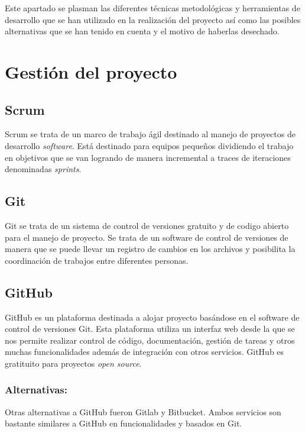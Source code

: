 
Este apartado se plasman las diferentes técnicas metodológicas y herramientas de desarrollo que se han utilizado en la realización del proyecto así como las posibles alternativas que se han tenido en cuenta y el motivo de haberlas desechado.

\section{Gestión del proyecto}\label{GesProyecto}
\subsection{Scrum}\label{Scrum}
Scrum se trata de un marco de trabajo ágil destinado al manejo de proyectos de desarrollo \emph{software}. Está destinado para equipos pequeños dividiendo el trabajo en objetivos que se van logrando de manera incremental a traces de iteraciones denominadas \emph{sprints}. \cite{wiki:scrm}

\subsection{Git}\label{Git}
Git se trata de un sistema de control de versiones gratuito y de codigo abierto para el manejo de proyecto. Se trata de un software de control de versiones de manera que se puede llevar un registro de cambios en los archivos y posibilita la coordinación de trabajos entre diferentes personas. \cite{}

\subsection{GitHub}\label{GitHub}
GitHub es un plataforma destinada a alojar proyecto basándose en el software de control de versiones Git. Esta plataforma utiliza un interfaz web desde la que se nos permite realizar control de código, documentación, gestión de tareas y otros muchas funcionalidades además de integración con otros servicios. GitHub es gratituito para proyectos \emph{open source}. \cite{}

\subsubsection{Alternativas:}\label{AlternativasGitHub}
Otras alternativas a GitHub fueron Gitlab y Bitbucket. Ambos servicios son bastante similares a GitHub en funcionalidades y basados en Git.


